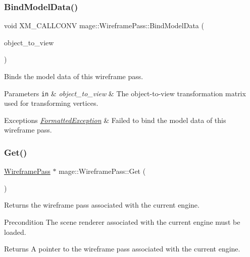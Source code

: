 \subsubsection{\texorpdfstring{Bind\+Model\+Data()}{BindModelData()}}
{\footnotesize\ttfamily void X\+M\+\_\+\+C\+A\+L\+L\+C\+O\+NV mage\+::\+Wireframe\+Pass\+::\+Bind\+Model\+Data (\begin{DoxyParamCaption}\item[{F\+X\+M\+M\+A\+T\+R\+IX}]{object\+\_\+to\+\_\+view }\end{DoxyParamCaption})\hspace{0.3cm}{\ttfamily [private]}}

Binds the model data of this wireframe pass.


\begin{DoxyParams}[1]{Parameters}
\mbox{\tt in}  & {\em object\+\_\+to\+\_\+view} & The object-\/to-\/view transformation matrix used for transforming vertices. \\
\hline
\end{DoxyParams}

\begin{DoxyExceptions}{Exceptions}
{\em \hyperlink{structmage_1_1_formatted_exception}{Formatted\+Exception}} & Failed to bind the model data of this wireframe pass. \\
\hline
\end{DoxyExceptions}
\hypertarget{classmage_1_1_wireframe_pass_ace5168eac9d32c1bfa71df3411960f48}{}\label{classmage_1_1_wireframe_pass_ace5168eac9d32c1bfa71df3411960f48} 
\subsubsection{\texorpdfstring{Get()}{Get()}}
{\footnotesize\ttfamily \hyperlink{classmage_1_1_wireframe_pass}{Wireframe\+Pass} $\ast$ mage\+::\+Wireframe\+Pass\+::\+Get (\begin{DoxyParamCaption}{ }\end{DoxyParamCaption})\hspace{0.3cm}{\ttfamily [static]}}

Returns the wireframe pass associated with the current engine.

\begin{DoxyPrecond}{Precondition}
The scene renderer associated with the current engine must be loaded. 
\end{DoxyPrecond}
\begin{DoxyReturn}{Returns}
A pointer to the wireframe pass associated with the current engine. 
\end{DoxyReturn}
\hypertarget{classmage_1_1_wireframe_pass_a57da0b468c68c8653ebc639923b111ba}{}\label{classmage_1_1_wireframe_pass_a57da0b468c68c8653ebc639923b111ba} 
